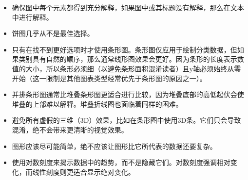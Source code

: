 \begin{itemize}
\item 确保图中每个元素都得到充分解释，如果图中或其标题没有解释，那么在文本中进行解释。
\item 饼图几乎从不是最佳选择。
\item 只有在找不到更好选项时才使用条形图。条形图仅应用于绘制分类数据，但如果类别具有自然的顺序，那么通常线形图效果会更好。因为条形的长度表示数值的大小，所以条形必须细（以避免条形面积混淆读者）且y轴必须始终从零开始（这一限制是其他图表类型经常优先于条形图的原因之一）。
\item 并排条形图通常比堆叠条形图更适合进行比较，因为堆叠底部的高低起伏会使堆叠的上部难以解释。堆叠折线图也面临着同样的困难。
\item 避免所有虚假的三维（3D）效果，比如在条形图中使用3D条。它们只会导致混淆，绝不会带来更清晰的视觉效果。
\item 图形应该尽可能简单，绝不应该让图形比它所代表的数据还要复杂。
\item 使用对数刻度来揭示数据中的趋势，而不是隐藏它们。对数刻度强调相对变化，而线性刻度则更适合显示绝对变化。

\end{itemize}
